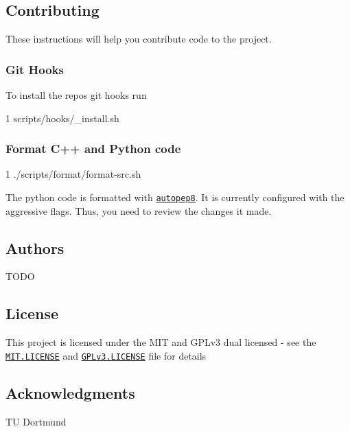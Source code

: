 \subsection*{Contributing}

These instructions will help you contribute code to the project.

\subsubsection*{Git Hooks}

To install the repos git hooks run 
\begin{DoxyCode}
1 scripts/hooks/\_install.sh
\end{DoxyCode}


\subsubsection*{Format C++ and Python code}


\begin{DoxyCode}
1 ./scripts/format/format-src.sh
\end{DoxyCode}


The python code is formatted with \href{https://github.com/hhatto/autopep8}{\tt autopep8}. It is currently configured with the aggressive flags. Thus, you need to review the changes it made.

\subsection*{Authors}


\begin{DoxyItemize}
\item T\+O\+DO
\end{DoxyItemize}

\subsection*{License}

This project is licensed under the M\+IT and G\+P\+Lv3 dual licensed -\/ see the \href{MIT.LICENSE}{\tt M\+I\+T.\+L\+I\+C\+E\+N\+SE} and \href{GPLv3.LICENSE}{\tt G\+P\+Lv3.\+L\+I\+C\+E\+N\+SE} file for details

\subsection*{Acknowledgments}


\begin{DoxyItemize}
\item TU Dortmund 
\end{DoxyItemize}